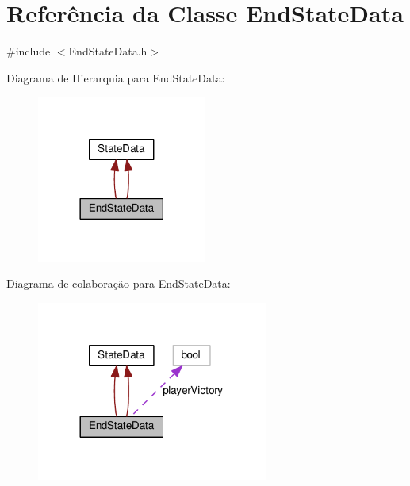 \hypertarget{classEndStateData}{\section{Referência da Classe End\+State\+Data}
\label{classEndStateData}
}


{\ttfamily \#include $<$End\+State\+Data.\+h$>$}



Diagrama de Hierarquia para End\+State\+Data\+:\nopagebreak
\begin{figure}[H]
\begin{center}
\leavevmode
\includegraphics[width=158pt]{classEndStateData__inherit__graph}
\end{center}
\end{figure}


Diagrama de colaboração para End\+State\+Data\+:\nopagebreak
\begin{figure}[H]
\begin{center}
\leavevmode
\includegraphics[width=216pt]{classEndStateData__coll__graph}
\end{center}
\end{figure}
